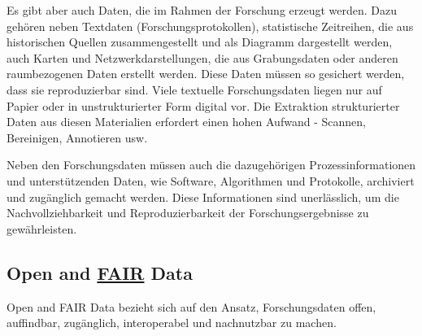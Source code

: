 \documentclass[
  nswissgerman,
  letterpaper,
  DIV=11,
  numbers=noendperiod]{scrartcl}
\begin{document}
Es gibt aber auch Daten, die im Rahmen der Forschung erzeugt werden.
Dazu gehören neben Textdaten (Forschungsprotokollen), statistische
Zeitreihen, die aus historischen Quellen zusammengestellt und als
Diagramm dargestellt werden, auch Karten und Netzwerkdarstellungen, die
aus Grabungsdaten oder anderen raumbezogenen Daten erstellt werden.
Diese Daten müssen so gesichert werden, dass sie reproduzierbar sind.
Viele textuelle Forschungsdaten liegen nur auf Papier oder in
unstrukturierter Form digital vor. Die Extraktion strukturierter Daten
aus diesen Materialien erfordert einen hohen Aufwand - Scannen,
Bereinigen, Annotieren usw.

Neben den Forschungsdaten müssen auch die dazugehörigen
Prozessinformationen und unterstützenden Daten, wie Software,
Algorithmen und Protokolle, archiviert und zugänglich gemacht werden.
Diese Informationen sind unerlässlich, um die Nachvollziehbarkeit und
Reproduzierbarkeit der Forschungsergebnisse zu gewährleisten.

\subsection{\texorpdfstring{Open and
\href{https://www.go-fair.org/fair-principles/}{FAIR}
Data}{Open and FAIR Data}}\label{open-and-fair-data}

Open and FAIR Data bezieht sich auf den Ansatz, Forschungsdaten offen,
auffindbar, zugänglich, interoperabel und nachnutzbar zu machen.
\end{document}

